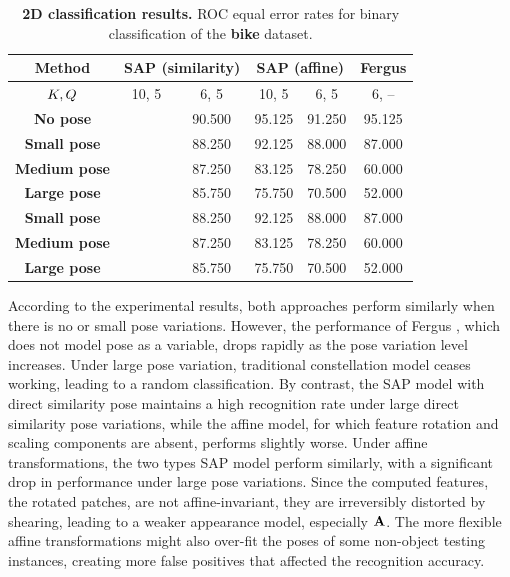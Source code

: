 \begin{table}
	\centering
	\begin{tabular}{|c|cc|cc|c|}
		\hline 
		\textbf{Method} & \multicolumn{2}{|c|}{SAP (similarity)} & \multicolumn{2}{|c|}{SAP (affine)} & Fergus \etal \cite{Fergus2007} \\  
		\hline 
		\hline 
		$K, Q$ & 10, 5 & 6, 5 & 10, 5 & 6, 5 & 6, -- \\		
		\hline 
		\textbf{No pose} 		& \textbf{\color{blue}{95.500}} & 90.500 & 95.125 & 91.250 & 95.125 \\ 
		\hline 
		\textbf{Small pose} 	& \textbf{\color{blue}{94.625}} & 88.250 & 92.125 & 88.000 & 87.000 \\ 
		\textbf{Medium pose} 	& \textbf{\color{blue}{93.250}} & 87.250 & 83.125 & 78.250 & 60.000 \\ 
		\textbf{Large pose} 	& \textbf{\color{blue}{92.250}} & 85.750 & 75.750 & 70.500 & 52.000 \\ 
		\hline
		\textbf{Small pose} 	& \textbf{\color{blue}{94.625}} & 88.250 & 92.125 & 88.000 & 87.000 \\ 
		\textbf{Medium pose} 	& \textbf{\color{blue}{93.250}} & 87.250 & 83.125 & 78.250 & 60.000 \\ 
		\textbf{Large pose} 	& \textbf{\color{blue}{92.250}} & 85.750 & 75.750 & 70.500 & 52.000 \\ 
		\hline 
	\end{tabular}
	\caption{\textbf{2D classification results.} ROC equal error rates for binary classification of the \textbf{bike} dataset.}
	\label{tab/reg/regresult2d}
\end{table}

According to the experimental results, both approaches perform similarly when there is no or small pose variations. However, the performance of Fergus \etal \cite{Fergus2007}, which does not model pose as a variable, drops rapidly as the pose variation level increases. Under large pose variation, traditional constellation model \cite{Fergus2007} ceases working, leading to a random classification. 
By contrast, the SAP model with direct similarity pose maintains a high recognition rate under large direct similarity pose variations, while the affine model, for which feature rotation and scaling components are absent, performs slightly worse. 
Under affine transformations, the two types SAP model perform similarly, with a significant drop in performance under large pose variations. Since the computed features, \ie the rotated patches, are not affine-invariant, they are irreversibly distorted by shearing, leading to a weaker appearance model, especially $\mathbf{A}$.
The more flexible affine transformations might also over-fit the poses of some non-object testing instances, creating more false positives that affected the recognition accuracy. 

